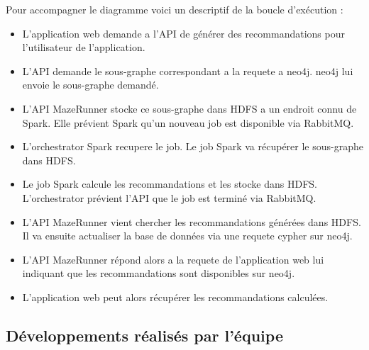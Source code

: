 Pour accompagner le diagramme voici un descriptif de la boucle d'exécution :
\begin{itemize}
  \item L'application web demande a l'API de générer des recommandations pour l'utilisateur de l'application.
  \item L'API demande le sous-graphe correspondant a la requete a neo4j. neo4j lui envoie le sous-graphe demandé.
  \item L'API MazeRunner stocke ce sous-graphe dans HDFS a un endroit connu de Spark. Elle prévient Spark qu'un nouveau job est disponible via RabbitMQ.
  \item L'orchestrator Spark recupere le job. Le job Spark va récupérer le sous-graphe dans HDFS.
  \item Le job Spark calcule les recommandations et les stocke dans HDFS. L'orchestrator prévient l'API que le job est terminé via RabbitMQ.
  \item L'API MazeRunner vient chercher les recommandations générées dans HDFS. Il va ensuite actualiser la base de données via une requete cypher sur neo4j.
  \item L'API MazeRunner répond alors a la requete de l'application web lui indiquant que les recommandations sont disponibles sur neo4j.
  \item L'application web peut alors récupérer les recommandations calculées.
\end{itemize}
\break
\subsection{Développements réalisés par l'équipe}

